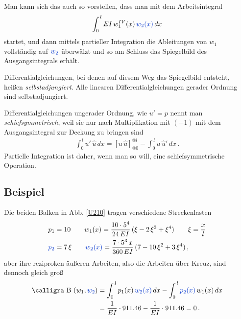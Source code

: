 Man kann sich das auch so vorstellen, dass man mit dem Arbeitsintegral
\begin{align}
\int_0^{\,l} EI\,w_1^{IV}(x)\,\textcolor{chapterTitleBlue}{w_2(x)}\,dx
\end{align}
startet, und dann mittels partieller Integration die Ableitungen von $w_1$ vollst\"{a}ndig auf $\textcolor{chapterTitleBlue}{w_2} $ \"{u}berw\"{a}lzt und so am Schluss das Spiegelbild des Ausgangsintegrals erh\"{a}lt.

Differentialgleichungen, bei denen auf diesem Weg das Spiegelbild entsteht, hei{\ss}en {\em selbstadjungiert\/}. Alle linearen Differentialgleichungen gerader Ordnung sind selbstadjungiert.

Differentialgleichungen ungerader Ordnung, wie $u' = p$ nennt man {\em schiefsymmetrisch\/},  weil sie nur nach Multiplikation mit $(-1)$ mit dem Ausgangsintegral zur Deckung zu bringen sind
\begin{align}\label{Eq58}
\int_0^{\,l} u'\,\hat{u}\,dx = [u\,\hat{u}]_{@0}^{@l} - \int_0^{\,l} u\,\hat{u}'\,dx\,.
\end{align}
Partielle Integration ist daher, wenn man so will, eine \glq schiefsymmetrische\grq{} Operation.

{\textcolor{sectionTitleBlue}{\subsection*{Beispiel}}}
Die beiden Balken in Abb. \ref{U210} tragen verschiedene Streckenlasten
\begin{align}
p_1 &= 10 \qquad w_1(x) = \frac{10\cdot 5^4}{24\,EI}\,(\xi - 2\,\xi^3 + \xi^4) \qquad \xi = \frac{x}{l}\\
\textcolor{chapterTitleBlue}{p_2} &= 7\,\xi \qquad \textcolor{chapterTitleBlue}{w_2(x)} = \frac{7\cdot 5^3\,x}{360\,EI}\,(7 - 10\,\xi^2 + 3\,\xi^4)\,,
\end{align}
aber ihre reziproken \"{a}u{\ss}eren Arbeiten, also die Arbeiten \glq \"{u}ber Kreuz\grq{}, sind dennoch gleich gro{\ss}
\begin{align}\label{Eq35}
\text{\normalfont\calligra B\,\,}(w_1,\textcolor{chapterTitleBlue}{w_2}) &= \int_0^{\,l} p_1(x)\,\textcolor{chapterTitleBlue}{w_2(x)}\,dx - \int_0^{\,l} \textcolor{chapterTitleBlue}{p_2(x)}\,w_1(x)\,dx\nn \\
 &= \frac{1}{EI}\cdot 911.46 - \frac{1}{EI}\cdot 911.46 = 0\,.
\end{align}

